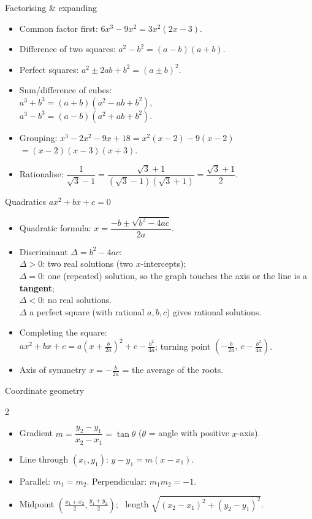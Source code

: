 \begin{cols}
\begin{keyres}{Factorising \& expanding}
\small
\begin{itemize}
  \item Common factor first: $6x^3-9x^2=3x^2(2x-3)$.
  \item Difference of two squares: $a^2-b^2=(a-b)(a+b)$.
  \item Perfect squares: $a^2\pm2ab+b^2=(a\pm b)^2$.
  \item Sum/difference of cubes:\\ $a^3+b^3=(a+b)(a^2-ab+b^2)$,\\ $a^3-b^3=(a-b)(a^2+ab+b^2)$.
  \item Grouping: $x^3-2x^2-9x+18=x^2(x-2)-9(x-2)$\\ $=(x-2)(x-3)(x+3)$.
  \item Rationalise: $\dfrac{1}{\sqrt3-1}=\dfrac{\sqrt3+1}{(\sqrt3-1)(\sqrt3+1)}=\dfrac{\sqrt3+1}{2}$.
\end{itemize}
\end{keyres}
\nextcol
\begin{keyres}{Quadratics $ax^2+bx+c=0$}
\small
\begin{itemize}
  \item Quadratic formula: $x=\dfrac{-b\pm\sqrt{b^2-4ac}}{2a}$.
  \item Discriminant $\Delta=b^2-4ac$:\\ $\Delta>0$: two real solutions (two $x$-intercepts);\\ $\Delta=0$: one (repeated) solution, so the graph touches the axis or the line is a \textbf{tangent};\\ $\Delta<0$: no real solutions.\\ $\Delta$ a perfect square (with rational $a,b,c$) gives rational solutions.
  \item Completing the square:\\ $ax^2+bx+c=a\left(x+\frac{b}{2a}\right)^2+c-\frac{b^2}{4a}$; turning point $\left(-\frac{b}{2a},\ c-\frac{b^2}{4a}\right)$.
  \item Axis of symmetry $x=-\frac{b}{2a}$ = the average of the roots.
\end{itemize}
\end{keyres}
\end{cols}

\begin{keyres}{Coordinate geometry}
\small
\begin{multicols}{2}
\begin{itemize}
  \item Gradient $m=\dfrac{y_2-y_1}{x_2-x_1}=\tan\theta$ ($\theta$ = angle with positive $x$-axis).
  \item Line through $(x_1,y_1)$: $y-y_1=m(x-x_1)$.
  \item Parallel: $m_1=m_2$. Perpendicular: $m_1m_2=-1$.
  \item Midpoint $\left(\frac{x_1+x_2}{2},\frac{y_1+y_2}{2}\right)$; \ length $\sqrt{(x_2-x_1)^2+(y_2-y_1)^2}$.
\end{itemize}
\end{multicols}
\end{keyres}


